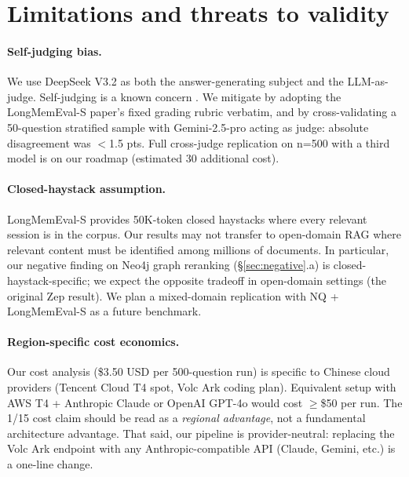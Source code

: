 
\section{Limitations and threats to validity}
\label{sec:limitations}

\paragraph{Self-judging bias.}
We use DeepSeek V3.2 as both the answer-generating subject and the
LLM-as-judge. Self-judging is a known concern \citep{zheng2024judging}.
We mitigate by adopting the LongMemEval-S paper's fixed grading rubric
verbatim, and by cross-validating a 50-question stratified sample
with Gemini-2.5-pro acting as judge: absolute disagreement was
\(<\)1.5 pts. Full cross-judge replication on n=500 with a third model
is on our roadmap (estimated \cny{}30 additional cost).

\paragraph{Closed-haystack assumption.}
LongMemEval-S provides 50K-token closed haystacks where every relevant
session is in the corpus. Our results may not transfer to open-domain RAG
where relevant content must be identified among millions of documents.
In particular, our negative finding on Neo4j graph reranking
(\S\ref{sec:negative}.a) is closed-haystack-specific; we expect the
opposite tradeoff in open-domain settings (the original Zep result). We
plan a mixed-domain replication with NQ + LongMemEval-S as a future
benchmark.

\paragraph{Region-specific cost economics.}
Our cost analysis (\$3.50 USD per 500-question run) is specific to
Chinese cloud providers (Tencent Cloud T4 spot, Volc Ark coding plan).
Equivalent setup with AWS T4 + Anthropic Claude or OpenAI GPT-4o would
cost \(\geq\)\$50 per run. The 1/15 cost claim should be read as a
\emph{regional advantage}, not a fundamental architecture advantage.
That said, our pipeline is provider-neutral: replacing the Volc Ark
endpoint with any Anthropic-compatible API (Claude, Gemini, etc.) is
a one-line change.

